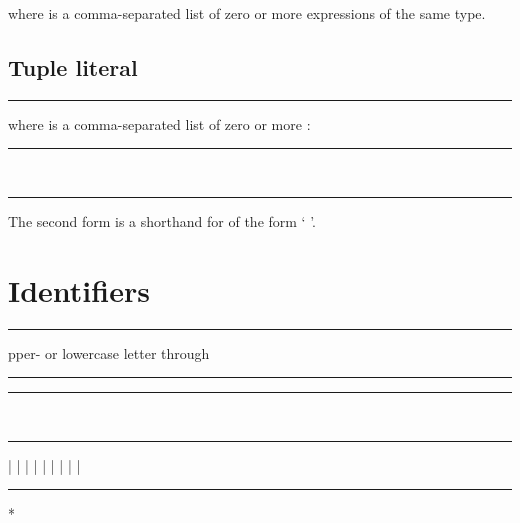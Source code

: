 where  is a comma-separated list of zero or more expressions of the
same type.

\subsection{Tuple literal}

\begin{grammar}
\rule{tuple-literal} \code{(}  \code{)}
\end{grammar}

where  is a comma-separated list of zero or more
:

\begin{grammar}
\rule{tuple-literal-element}  \code{:} \\
\rule{tuple-literal-element} 
\end{grammar}

The second form is a shorthand for  of the
form ` \code{:} '.

\section{Identifiers}

\begin{grammar}
\rule{identifier-first-character} upper- or lowercase letter  through \\
\rule{identifier-first-character} \code{\_}

\rule{identifier-character} \\
\rule{identifier-character}  |  |  |  |  |  |  |  |  | 

\rule{identifier}  *
\end{grammar}
